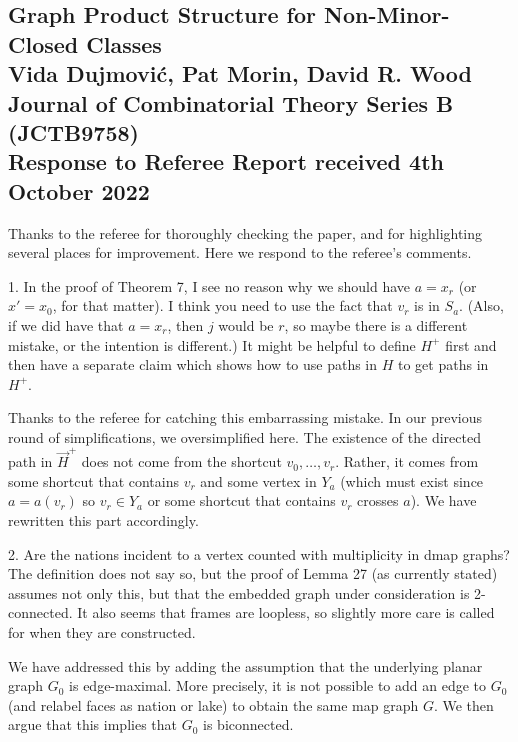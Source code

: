 \documentclass[12pt]{article}
\newenvironment{response}{\color{blue}}{}
\begin{document}
\subsection*{Graph Product Structure for Non-Minor-Closed Classes\\
Vida Dujmovi\'c, Pat Morin, David R. Wood\\
Journal of Combinatorial Theory Series B (JCTB9758)\\
Response to Referee Report received 4th October 2022}

Thanks to the referee for thoroughly checking the paper, and for highlighting several places for improvement. Here we respond to the referee's comments.

\hrulefill

1. In the proof of Theorem 7, I see no reason why we should have $a = x_r$
(or $x'=x_0$, for that matter). I think you need to use the fact that $v_r$ is
in $S_a$. (Also, if we did have that $a = x_r$, then $j$ would be $r$, so maybe
there is a different mistake, or the intention is different.) It might be
helpful to define $H^+$ first and then have a separate claim which shows
how to use paths in $H$ to get paths in $H^+$.

\begin{response}
  Thanks to the referee for catching this embarrassing mistake.  In our previous round of simplifications, we oversimplified here.  The existence of the directed path in $\overrightarrow{H}^+$ does not come from the shortcut $v_0,\ldots,v_r$.  Rather, it comes from some shortcut that contains $v_r$ and some vertex in $Y_a$ (which must exist since $a=a(v_r)$ so $v_r\in Y_a$ or some shortcut that contains $v_r$ crosses $a$).  We have rewritten this part accordingly.
\end{response}


2. Are the nations incident to a vertex counted with multiplicity in dmap graphs? The definition does not say so, but the proof of Lemma 27 (as currently stated) assumes not only this, but that the embedded graph under consideration is 2-connected.  It also seems that frames are loopless, so slightly more care is called for when they are constructed.

\begin{response}
  We have addressed this by adding the assumption that the underlying planar graph $G_0$ is edge-maximal. More precisely, it is not possible to add an edge to $G_0$ (and relabel faces as nation or lake) to obtain the same map graph $G$.  We then argue that this implies that $G_0$ is biconnected. 
\end{response}
\end{document}
